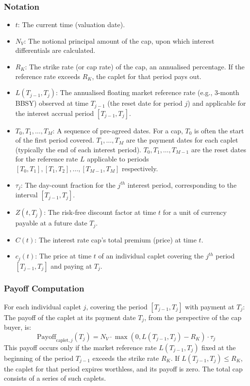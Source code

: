 \documentclass[11pt, a4paper, british]{article}
\begin{document}
\subsubsection{Notation}
\begin{itemize}
 \item $t$: The current time (valuation date).
 \item $N_V$: The notional principal amount of the cap, upon which interest differentials are calculated.
 \item $R_K$: The strike rate (or cap rate) of the cap, an annualised percentage. If the reference rate exceeds $R_K$, the caplet for that period pays out.
 \item $L(T_{j-1}, T_j)$: The annualised floating market reference rate (e.g., 3-month BBSY) observed at time $T_{j-1}$ (the reset date for period $j$) and applicable for the interest accrual period $[T_{j-1}, T_j]$.
 \item $T_0, T_1, \dots, T_M$: A sequence of pre-agreed dates. For a cap, $T_0$ is often the start of the first period covered. $T_1, \dots, T_M$ are the payment dates for each caplet (typically the end of each interest period). $T_0, T_1, \dots, T_{M-1}$ are the reset dates for the reference rate $L$ applicable to periods $[T_0,T_1], [T_1,T_2], \dots, [T_{M-1},T_M]$ respectively.
 \item $\tau_j$: The day-count fraction for the $j^{th}$ interest period, corresponding to the interval $[T_{j-1}, T_j]$.
 \item $Z(t, T_j)$: The risk-free discount factor at time $t$ for a unit of currency payable at a future date $T_j$.
 \item $C(t)$: The interest rate cap's total premium (price) at time $t$.
 \item $c_j(t)$: The price at time $t$ of an individual caplet covering the $j^{th}$ period $[T_{j-1}, T_j]$ and paying at $T_j$.
\end{itemize}

\subsubsection{Payoff Computation}

For each individual caplet $j$, covering the period $[T_{j-1}, T_j]$ with payment at $T_j$:
The payoff of the caplet at its payment date $T_j$, from the perspective of the cap buyer, is:
\begin{equation}
 \text{Payoff}_{\text{caplet}, j}(T_j) = N_V \cdot \max(0, L(T_{j-1}, T_j) - R_K) \cdot \tau_j
 \label{eq:caplet_payoff_rigorous}
\end{equation}
This payoff occurs only if the market reference rate $L(T_{j-1}, T_j)$ fixed at the beginning of the period $T_{j-1}$ exceeds the strike rate $R_K$. If $L(T_{j-1}, T_j) \le R_K$, the caplet for that period expires worthless, and its payoff is zero. The total cap consists of a series of such caplets.
\end{document}
